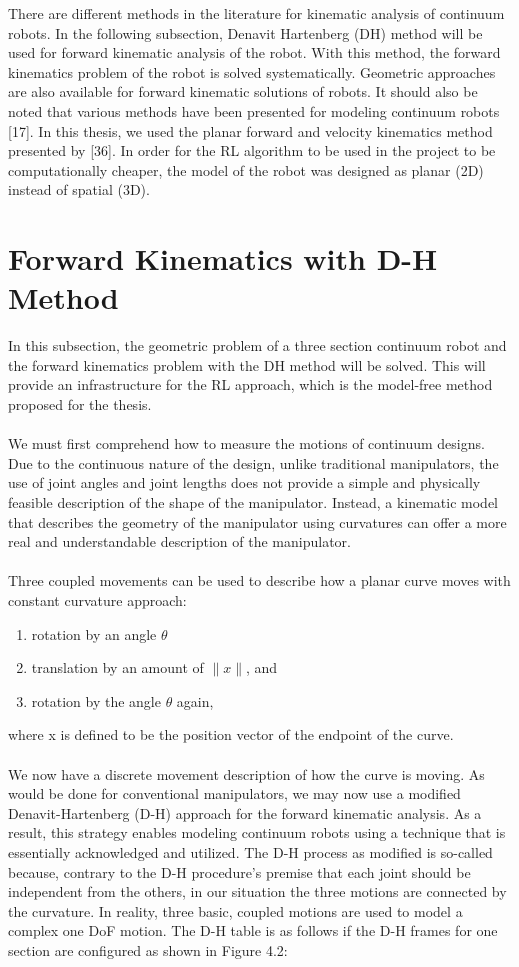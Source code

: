 \documentclass[12pt,twoside,a4]{mwbk}
\begin{document}
\noindent There are different methods in the literature for kinematic analysis of continuum robots. In the following subsection, Denavit Hartenberg (DH) method will be used for forward kinematic analysis of the robot. With this method, the forward kinematics problem of the robot is solved systematically. Geometric approaches are also available for forward kinematic solutions of robots. It should also be noted that various methods have been presented for modeling continuum robots [17]. In this thesis, we used the planar forward and velocity kinematics method presented by [36]. In order for the RL algorithm to be used in the project to be computationally cheaper, the model of the robot was designed as planar (2D) instead of spatial (3D).

\section{Forward Kinematics with D-H Method}
In this subsection, the geometric problem of a three section continuum robot and the forward kinematics problem with the DH method will be solved. This will provide an infrastructure for the RL approach, which is the model-free method proposed for the thesis.
\\ \\
We must first comprehend how to measure the motions of continuum designs. Due to the continuous nature of the design, unlike traditional manipulators, the use of joint angles and joint lengths does not provide a simple and physically feasible description of the shape of the manipulator. Instead, a kinematic model that describes the geometry of the manipulator using curvatures can offer a more real and understandable description of the manipulator.
\\ \\
Three coupled movements can be used to describe how a planar curve moves with constant curvature approach:
\begin{enumerate}
    \item rotation by an angle $\theta$
    \item translation by an amount of $\parallel x\parallel$, and
    \item rotation by the angle $\theta$ again,
\end{enumerate}
where x is defined to be the position vector of the endpoint of the curve.
\\ \\
We now have a discrete movement description of how the curve is moving. As would be done for conventional manipulators, we may now use a modified Denavit-Hartenberg (D-H) approach for the forward kinematic analysis. As a result, this strategy enables modeling continuum robots using a technique that is essentially acknowledged and utilized. The D-H process as modified is so-called because, contrary to the D-H procedure's premise that each joint should be independent from the others, in our situation the three motions are connected by the curvature. In reality, three basic, coupled motions are used to model a complex one DoF motion. The D-H table is as follows if the D-H frames for one section are configured as shown in Figure 4.2:
\end{document}
